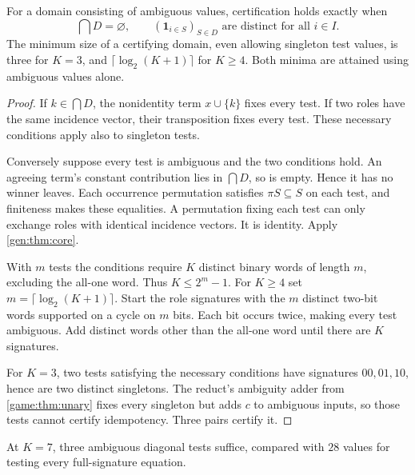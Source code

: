 \begin{proposition}\label{gen:thm:idem-domain}
For a domain consisting of ambiguous values, certification holds exactly
when
\[
 \bigcap D=\varnothing,\qquad
 (\mathbf1_{i\in S})_{S\in D}\text{ are distinct for all }i\in I.
\]
The minimum size of a certifying domain, even allowing singleton test
values, is three for $K=3$, and $\lceil\log_2(K+1)\rceil$ for $K\geq4$.
Both minima are attained using ambiguous values alone.
\end{proposition}
\begin{proof}
If $k\in\bigcap D$, the nonidentity term $x\cup\{k\}$ fixes every test.
If two roles have the same incidence vector, their transposition fixes
every test. These necessary conditions apply also to singleton tests.

Conversely suppose every test is ambiguous and the two conditions hold.
An agreeing term's constant contribution lies in $\bigcap D$, so is
empty. Hence it has no winner leaves. Each occurrence permutation
satisfies $\pi S\subseteq S$ on each test, and finiteness makes these
equalities. A permutation fixing each test can only exchange roles with
identical incidence vectors. It is identity. Apply \cref{gen:thm:core}.

With $m$ tests the conditions require $K$ distinct binary words of
length $m$, excluding the all-one word. Thus $K\leq2^m-1$. For $K\geq4$
set $m=\lceil\log_2(K+1)\rceil$. Start the role signatures with the $m$
distinct two-bit words supported on a cycle on $m$ bits. Each bit occurs
twice, making every test ambiguous. Add distinct words other than the
all-one word until there are $K$ signatures.

For $K=3$, two tests satisfying the necessary conditions have signatures
$00,01,10$, hence are two distinct singletons. The reduct's ambiguity
adder from \cref{game:thm:unary} fixes every singleton but adds $c$ to
ambiguous inputs, so those tests cannot certify idempotency.
Three pairs certify it.
\end{proof}

At $K=7$, three ambiguous diagonal tests suffice, compared with $28$ values for testing every full-signature equation.

